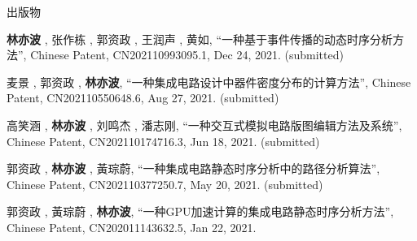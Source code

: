 \begin{rSection}{出版物}
\begin{description}[font=\normalfont, rightmargin=2em]
\item[{[P5]}]{
        \textbf{林亦波} ,  张作栋 ,  郭资政 ,  王润声 ,  黄如, 
    ``一种基于事件传播的动态时序分析方法'', 
    Chinese Patent, CN202110993095.1, Dec 24, 2021.
    (submitted)
}
            

\item[{[P4]}]{
        麦景 ,  郭资政 ,  \textbf{林亦波}, 
    ``一种集成电路设计中器件密度分布的计算方法'', 
    Chinese Patent, CN202110550648.6, Aug 27, 2021.
    (submitted)
}
            

\item[{[P3]}]{
        高笑涵 ,  \textbf{林亦波} ,  刘鸣杰 ,  潘志刚, 
    ``一种交互式模拟电路版图编辑方法及系统'', 
    Chinese Patent, CN202110174716.3, Jun 18, 2021.
    (submitted)
}
            

\item[{[P2]}]{
        郭资政 ,  \textbf{林亦波} ,  黃琮蔚, 
    ``一种集成电路静态时序分析中的路径分析算法'', 
    Chinese Patent, CN202110377250.7, May 20, 2021.
    (submitted)
}
            

\item[{[P1]}]{
        郭资政 ,  黃琮蔚 ,  \textbf{林亦波}, 
    ``一种GPU加速计算的集成电路静态时序分析方法'', 
    Chinese Patent, CN202011143632.5, Jan 22, 2021.
    
}
            

\end{description}
    

\end{rSection}


